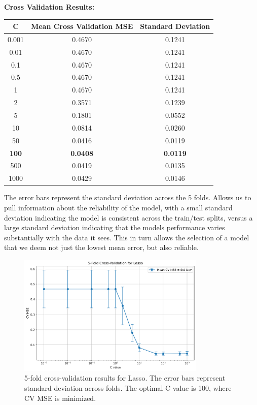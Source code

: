 \documentclass[11pt,a4paper]{article}
\begin{document}
\textbf{Cross Validation Results:}

\begin{table}[H]
\centering
\begin{tabular}{ccc}
\toprule
C & Mean Cross Validation MSE & Standard Deviation \\
\midrule
0.001 & 0.4670 & 0.1241 \\
0.01 & 0.4670 & 0.1241 \\
0.1 & 0.4670 & 0.1241 \\
0.5 & 0.4670 & 0.1241 \\
1 & 0.4670 & 0.1241 \\
2 & 0.3571 & 0.1239 \\
5 & 0.1801 & 0.0552 \\
10 & 0.0814 & 0.0260 \\
50 & 0.0416 & 0.0119 \\
\textbf{100} & \textbf{0.0408} & \textbf{0.0119} \\
500 & 0.0419 & 0.0135 \\
1000 & 0.0429 & 0.0146 \\
\bottomrule
\end{tabular}
\end{table}

The error bars represent the standard deviation across the 5 folds. Allows us to pull information about the reliability of the model, with a small standard deviation indicating the model is consistent across the train/test splits, versus a large standard deviation indicating that the models performance varies substantially with the data it sees. This in turn allows the selection of a model that we deem not just the lowest mean error, but also reliable.

\begin{figure}[H]
\centering
\includegraphics[width=0.8\textwidth]{figures/06_lasso_cv_results.png}
\caption{5-fold cross-validation results for Lasso. The error bars represent standard deviation across folds. The optimal C value is 100, where CV MSE is minimized.}
\label{fig:lasso_cv}
\end{figure}
\end{document}
